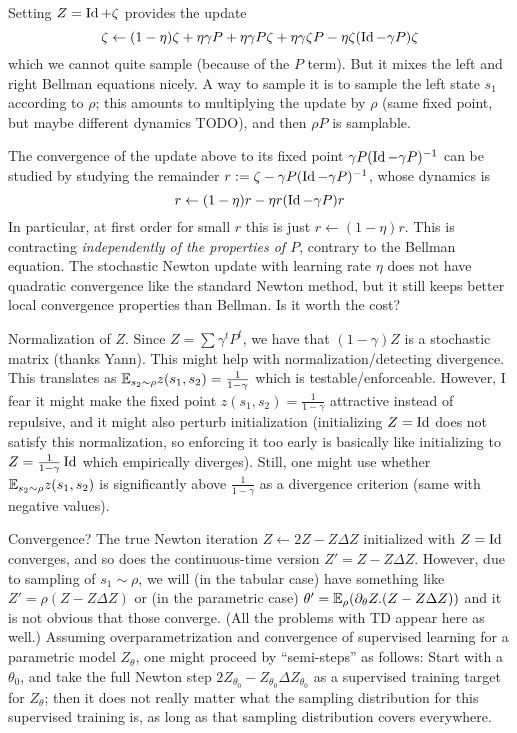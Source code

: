 \documentclass[11pt,a4paper]{article}
\begin{document}
Setting $Z=\operatorname{Id}+\zeta$ provides the update
\begin{equation}
\zeta\gets (1-\eta)\zeta+\eta\gamma P+\eta\gamma P\zeta
+\eta\gamma \zeta P-\eta\zeta(\operatorname{Id}-\gamma P)\zeta
\end{equation}
which we cannot quite sample (because of the $P$ term). But it mixes the
left and right Bellman equations nicely. A way to sample it is to sample
the left state $s_1$ according to $\rho$; this amounts to multiplying the
update by $\rho$ (same fixed point, but maybe different dynamics TODO),
and then $\rho P$ is samplable.

The convergence of the update above to its fixed point $\gamma
P(\operatorname{Id}-\gamma P)^{-1}$ can be studied by studying the
remainder $r\mathrel{\mathop{:}}= \zeta-\gamma
P(\operatorname{Id}-\gamma P)^{-1}$, whose dynamics is
\begin{equation}
r\gets (1-\eta) r-\eta r(\operatorname{Id}-\gamma P)r
\end{equation}
In particular, at first order for small $r$ this is just $r\gets
(1-\eta)r$. This is contracting \emph{independently of the properties of
$P$}, contrary to the Bellman equation. The stochastic
Newton update with learning rate $\eta$ does not have quadratic
convergence like the standard Newton method, but it still keeps better
local convergence properties than Bellman. Is it worth the cost?

Normalization of $Z$. Since $Z=\sum \gamma^t P^t$, we have that
$(1-\gamma)Z$ is a stochastic matrix (thanks Yann). This might help with
normalization/detecting divergence. This translates as $\mathbb{E}_{s_2\sim \rho}
z(s_1,s_2)=\frac{1}{1-\gamma}$ which is testable/enforceable. However, I
fear it might make the fixed point $z(s_1,s_2)=\frac{1}{1-\gamma}$
attractive instead of repulsive, and it might also perturb initialization
(initializing $Z=\operatorname{Id}$ does not satisfy this normalization, so enforcing
it too early is basically like initializing to
$Z=\frac{1}{1-\gamma}\operatorname{Id}$ which empirically diverges). Still, one might
use whether $\mathbb{E}_{s_2\sim \rho}z(s_1,s_2)$ is significantly above
$\frac1{1-\gamma}$ as a divergence criterion (same with negative values).

Convergence? The true Newton iteration $Z\gets 2Z-Z\Delta Z$ initialized
with $Z=\operatorname{Id}$ converges, and so does the continuous-time version
$Z'=Z-Z\Delta Z$. However, due to sampling of $s_1\sim \rho$, we will (in
the tabular case) have something like $Z'=\rho(Z-Z\Delta Z)$ or (in the
parametric case) $\theta'=\mathbb{E}_\rho (\partial_\theta Z.(Z-Z\Delta Z))$ and
it is not obvious that those converge. (All the problems with TD appear
here as well.) Assuming overparametrization and convergence of supervised
learning for a parametric model $Z_\theta$, one might proceed by
``semi-steps'' as follows: Start with a $\theta_0$, and take the full
Newton step $2Z_{\theta_0}-Z_{\theta_0}\Delta Z_{\theta_0}$ as a
supervised training target for $Z_\theta$; then it does not really matter
what the sampling distribution for this supervised training is, as long
as that sampling distribution covers everywhere.
\end{document}
